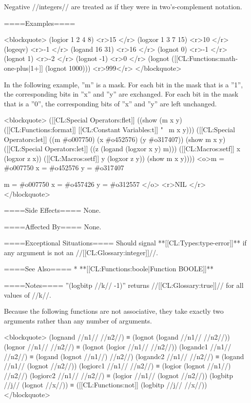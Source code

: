 Negative //integers// are treated as if they were in two's-complement notation.

====Examples====

<blockquote>
(logior 1 2 4 8) <r>15 </r>
(logxor 1 3 7 15) <r>10 </r>
(logeqv) <r>-1 </r>
(logand 16 31) <r>16 </r>
(lognot 0) <r>-1 </r>
(lognot 1) <r>-2 </r>
(lognot -1) <r>0 </r>
(lognot ([[CL:Functions:math-one-plus|1+]] (lognot 1000))) <r>999</r>
</blockquote>

In the following example, ''m'' is a mask. For each bit in the mask that is a ''1'', the corresponding bits in ''x'' and ''y'' are exchanged. For each bit in the mask that is a ''0'', the corresponding bits of ''x'' and ''y'' are left unchanged. 

<blockquote>
([[CL:Special Operators:flet]] ((show (m x y) 
         ([[CL:Functions:format]] [[CL:Constant Variables:t]] "~%
                 m x y))) 
  ([[CL:Special Operators:let]] ((m #o007750) 
        (x #o452576) 
        (y #o317407)) 
    (show m x y) 
    ([[CL:Special Operators:let]] ((z (logand (logxor x y) m))) 
      ([[CL:Macros:setf]] x (logxor z x)) 
      ([[CL:Macros:setf]] y (logxor z y)) 
      (show m x y))))
<o>m = #o007750
x = #o452576
y = #o317407

m = #o007750
x = #o457426
y = #o312557 </o>
<r>NIL </r>
</blockquote>

====Side Effects====
None.

====Affected By====
None.

====Exceptional Situations====
Should signal **[[CL:Types:type-error]]** if any argument is not an //[[CL:Glossary:integer]]//.

====See Also====
  * **[[CL:Functions:boole|Function BOOLE]]**

====Notes====
''(logbitp //k// -1)'' returns //[[CL:Glossary:true]]// for all values of //k//.

Because the following functions are not associative, they take exactly two arguments rather than any number of arguments.

<blockquote> 
(lognand //n1// //n2//) ≡ (lognot (logand //n1// //n2//)) 
(lognor //n1// //n2//) ≡ (lognot (logior //n1// //n2//)) 
(logandc1 //n1// //n2//) ≡ (logand (lognot //n1//) //n2//) 
(logandc2 //n1// //n2//) ≡ (logand //n1// (lognot //n2//)) 
(logiorc1 //n1// //n2//) ≡ (logior (lognot //n1//) //n2//) 
(logiorc2 //n1// //n2//) ≡ (logior //n1// (lognot //n2//)) 
(logbitp //j// (lognot //x//)) ≡ ([[CL:Functions:not]] (logbitp //j// //x//)) 
</blockquote>

